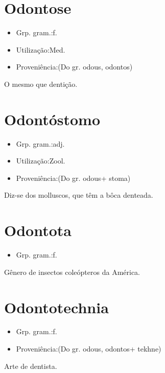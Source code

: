 \section{Odontose}
\begin{itemize}
\item {Grp. gram.:f.}
\end{itemize}
\begin{itemize}
\item {Utilização:Med.}
\end{itemize}
\begin{itemize}
\item {Proveniência:(Do gr. \textunderscore odous\textunderscore , \textunderscore odontos\textunderscore )}
\end{itemize}
O mesmo que \textunderscore dentição\textunderscore .
\section{Odontóstomo}
\begin{itemize}
\item {Grp. gram.:adj.}
\end{itemize}
\begin{itemize}
\item {Utilização:Zool.}
\end{itemize}
\begin{itemize}
\item {Proveniência:(Do gr. \textunderscore odous\textunderscore  + \textunderscore stoma\textunderscore )}
\end{itemize}
Diz-se dos molluscos, que têm a bôca denteada.
\section{Odontota}
\begin{itemize}
\item {Grp. gram.:f.}
\end{itemize}
Gênero de insectos coleópteros da América.
\section{Odontotechnia}
\begin{itemize}
\item {Grp. gram.:f.}
\end{itemize}
\begin{itemize}
\item {Proveniência:(Do gr. \textunderscore odous\textunderscore , \textunderscore odontos\textunderscore  + \textunderscore tekhne\textunderscore )}
\end{itemize}
Arte de dentista.
